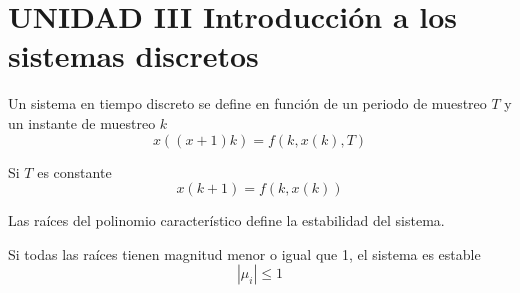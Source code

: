 \section{UNIDAD III Introducción a los sistemas discretos}

Un sistema en tiempo discreto se define en función de un periodo de muestreo \( T \) y un instante de muestreo \( k \)
\[
    x((x+1)k) = f(k,x(k), T)
\]

Si \( T \) es constante
\[
    x(k+1) = f(k, x(k))
\]

Las raíces del polinomio característico define la estabilidad del sistema.

Si todas las raíces tienen magnitud menor o igual que 1, el sistema es estable
\[
    |\mu_{i}| \leq 1
\]